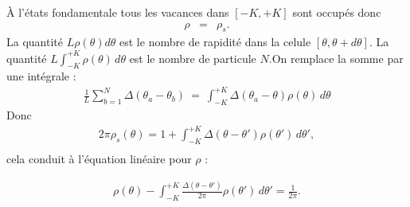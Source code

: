 À l'états fondamentale tous les vacances dans $[-K , +K ]$  sont occupés donc 
\begin{eqnarray*}
	\rho  & = & \rho_s.	
\end{eqnarray*}
La quantité $L\rho(\theta)d\theta$ est le nombre de rapidité dans la celule $[ \theta , \theta + d \theta ] $. La quantité $L \int_{-K}^{+K} \rho (\theta ) \, d\theta $ est le nombre de particule $N$.On remplace la somme par une intégrale :
\begin{eqnarray*}
	\frac{1}{L}\sum_{b = 1}^N \Delta (\theta_a - \theta_b) ~=~ \int_{-K}^{+K}\Delta (\theta_a - \theta)\rho(\theta)\,d \theta
\end{eqnarray*}
Donc
\begin{eqnarray*}
	2\pi \rho_s (\theta)  = 1 + \int_{-K}^{+K}\Delta (\theta - \theta')\rho(\theta')\,d \theta',\\
\end{eqnarray*}
cela conduit à l'équation linéaire pour $\rho$ :

\begin{eqnarray*}
	\rho (\theta) - \int_{-K}^{+K} \frac{\Delta(\theta - \theta')}{2\pi} \rho(\theta')\, d\theta' = \frac{1}{2\pi}.	
\end{eqnarray*}
